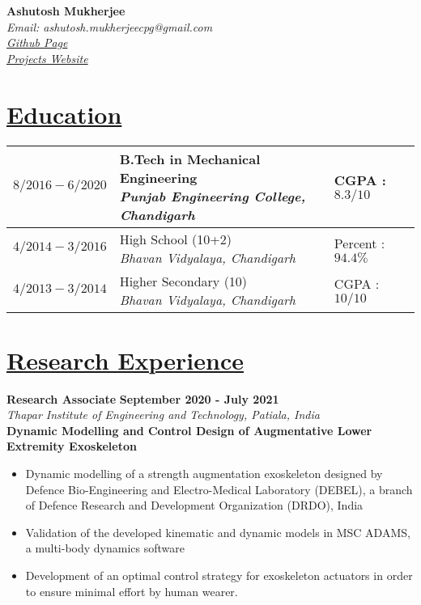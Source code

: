 \documentclass{article}
\makeatletter
\renewcommand{\maketitle}{
\begin{center}
\Large{\textbf{Ashutosh Mukherjee}}\\
\large{\textit{Email: ashutosh.mukherjeecpg@gmail.com}}\\
\href{https://github.com/average-engineer}{\large{\textit{Github Page}}}\\
\href{https://average-engineer.github.io/Projects-Website-Ashutosh-Mukherjee/}{\large{\textit{Projects Website}}}\\
\end{center}}
\def\degree{\large{B.Tech in Mechanical Engineering}}
\def\college{\large{\textit{Punjab Engineering College, Chandigarh}}}
\def\school{\large{High School (10+2)}}
\def\sname{\large{\textit{Bhavan Vidyalaya, Chandigarh}}}
\def\tenth{\large{Higher Secondary (10)}}
\def\cgpa{\large{CGPA : $8.3/10$}}
\def\boards{\large{Percent : $94.4\%$}}
\def\tenmarks{\large{CGPA : $10/10$}}
\def\drdodate{\large{\textbf{September 2020 - July 2021}}}
\makeatother
\begin{document}
\maketitle
\vspace{-1 em}
\hrulefill %
\vspace{-0.1 in}
\section{\underline{Education}}
\vspace{-1.5 em}
\begin{table}[H]
\centering
\begin{tabular}{|m{1.5in}|m{3in}|m{1.5in}|}
\hline 
\large{$8/2016 - 6/2020$} & \thead{\degree \\[0.1 in] \college}\ & \cgpa \\ 
\hline 
\large{$4/2014 - 3/2016$} & \thead{\school \\[0.1 in] \sname} &  \boards\\ 
\hline
\large{$4/2013 - 3/2014$} & \thead{\tenth \\[0.1 in] \sname} & \tenmarks \\
\hline
\end{tabular}
\end{table}
\vspace{0 in}

\section{\underline{Research Experience}}
\large{\textbf{Research Associate}}
\hspace{4.1 in}
\drdodate\\
\textit{\large{Thapar Institute of Engineering and Technology, Patiala, India}}\\
\textbf{Dynamic Modelling and Control Design of Augmentative Lower Extremity Exoskeleton}
\begin{itemize}
\item \large{Dynamic modelling of a strength augmentation exoskeleton designed by Defence Bio-Engineering and Electro-Medical Laboratory (DEBEL), a branch of Defence Research and Development Organization (DRDO), India}
\item\large{Validation of the developed kinematic and dynamic models in MSC ADAMS, a multi-body dynamics software}
\item\large{Development of an optimal control strategy for exoskeleton actuators in order to ensure minimal effort by human wearer.}
\end{itemize}
\end{document}
